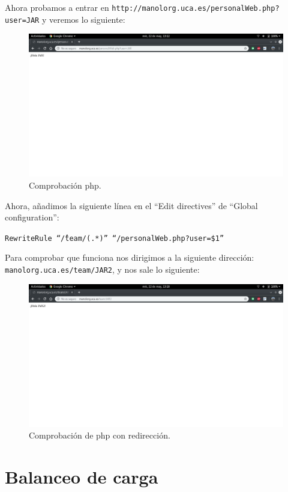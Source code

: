 \documentclass[12pt,letterpaper]{article}
\begin{document}
\begin{itemize}
	Ahora probamos a entrar en \texttt{http://manolorg.uca.es/personalWeb.php?user=JAR} y veremos lo siguiente:
	\newpage
	\begin{figure}[h]
		\centering
		\includegraphics[scale=0.34]{JAR.png}
		\caption{Comprobación php.}
		\label{Comprobación php}
	\end{figure}

	Ahora, añadimos la siguiente línea en el ``Edit directives'' de ``Global configuration'':
	\begin{center}
		\texttt{RewriteRule ``\^/team/(.*)'' ``/personalWeb.php?user=\$1''}
	\end{center}
	
	Para comprobar que funciona nos dirigimos a la siguiente dirección:\\ \texttt{manolorg.uca.es/team/JAR2}, y nos sale lo siguiente:
	\newpage
	\begin{figure}[h]
		\centering
		\includegraphics[scale=0.34]{JAR2.png}
		\caption{Comprobación de php con redirección.}
		\label{PHP2}
	\end{figure}
\end{itemize}

\section{Balanceo de carga}
\end{document}
